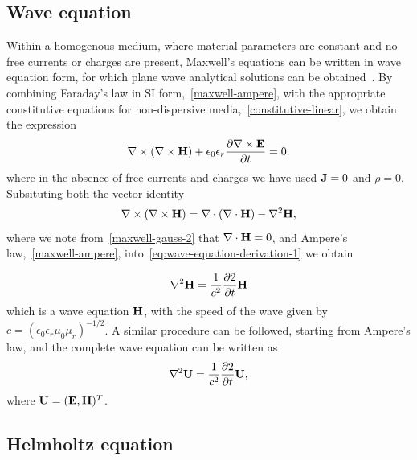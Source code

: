 \subsection{Wave equation}

Within a homogenous medium, where material parameters are constant and no free currents or charges are present, Maxwell's equations can be written in wave equation form, for which plane wave analytical solutions can be obtained~\cite{Jackson:490457}. By combining Faraday's law in SI form,~\eqref{maxwell-ampere}, with the appropriate constitutive equations for non-dispersive media,~\eqref{constitutive-linear}, we obtain the expression
\begin{equation}
\label{eq:wave-equation-derivation-1}
\nabla \times ( \nabla \times \mathbf{H} ) + \epsilon_0 \epsilon_r \frac{\partial  \nabla \times \mathbf{E} }{\partial t} = 0 .
\end{equation}
where in the absence of free currents and charges we have used $\mathbf{J} = 0$ and $\rho = 0$.
Subsituting both the vector identity
$$
\nabla \times ( \nabla \times \mathbf{H} ) = \nabla \cdot ( \nabla \cdot \mathbf{H} ) - \nabla^2 \mathbf{H},
$$
where we note from~\eqref{maxwell-gauss-2} that $\nabla \cdot \mathbf{H} = 0$, and Ampere's law,~\eqref{maxwell-ampere}, into~\eqref{eq:wave-equation-derivation-1} we obtain

\begin{equation}
\label{maxwell-wave-eqtn-E}
    \nabla^2 \mathbf{H} = \frac{1}{c^2} \frac{\partial 2}{\partial t}{ \mathbf{H} }
\end{equation}
which is a wave equation $\mathbf{H}$, with the speed of the wave given by $c = (\epsilon_0 \epsilon_r \mu_0 \mu_r )^{-1/2}$. A similar procedure can be followed, starting from Ampere's law, and the complete wave equation can be written as
\begin{equation}
\label{maxwell-wave-eqtn-E}
    \nabla^2 \mathbf{U} = \frac{1}{c^2} \frac{\partial 2}{\partial t}{ \mathbf{U} } ,
\end{equation}
where $\mathbf{U} = ( \mathbf{E}, \mathbf{H} )^T$.


\subsection{Helmholtz equation}

